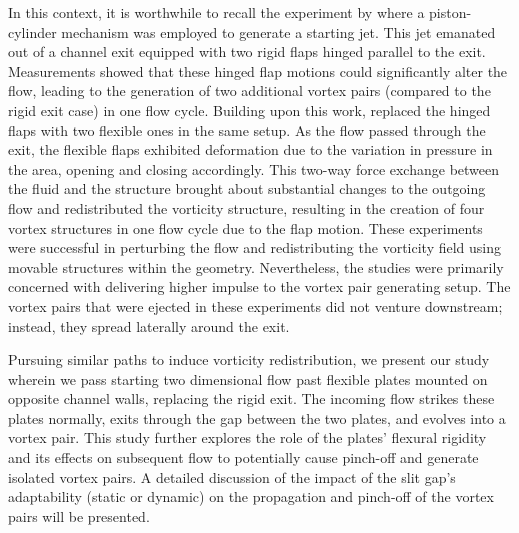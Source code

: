\documentclass[final,3p,times,authoryear]{elsarticle}
\begin{document}
	In this context, it is worthwhile to recall the experiment by \cite{arakeri_2013} where a piston-cylinder mechanism was employed to generate a starting jet. This jet emanated out of a channel exit equipped with two rigid flaps hinged parallel to the exit. Measurements showed that these hinged flap motions could significantly alter the flow, leading to the generation of two additional vortex pairs (compared to the rigid exit case) in one flow cycle. Building upon this work, \cite{arakeri_2018} replaced the hinged flaps with two flexible ones in the same setup. As the flow passed through the exit, the flexible flaps exhibited deformation due to the variation in pressure in the area, opening and closing accordingly. This two-way force exchange between the fluid and the structure brought about substantial changes to the outgoing flow and redistributed the vorticity structure, resulting in the creation of four vortex structures in one flow cycle due to the flap motion. These experiments were successful in perturbing the flow and redistributing the vorticity field using movable structures within the geometry. Nevertheless, the studies were primarily concerned with delivering higher impulse to the vortex pair generating setup. The vortex pairs that were ejected in these experiments did not venture downstream; instead, they spread laterally around the exit.
	
	Pursuing similar paths to induce vorticity redistribution, we present our study wherein we pass starting two dimensional flow past flexible plates mounted on opposite channel walls, replacing the rigid exit. The incoming flow strikes these plates normally, exits through the gap between the two plates, and evolves into a vortex pair. This study further explores the role of the plates' flexural rigidity and its effects on subsequent flow to potentially cause pinch-off and generate isolated vortex pairs. A detailed discussion of the impact of the slit gap's adaptability (static or dynamic) on the propagation and pinch-off of the vortex pairs will be presented. 
	
\end{document}
